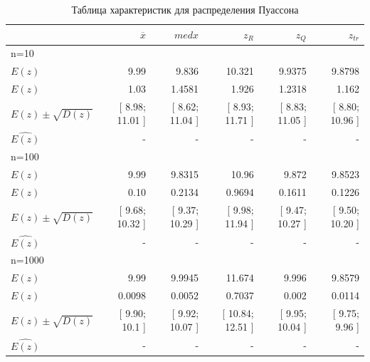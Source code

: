 \documentclass[a4paper,14pt]{article}
\begin{document}
	\begin{table}[H]
		\centering
		\begin{tabular}[t]{|l|r|r|r|r|r|}
			\hline
			& $\overline{x}$ & $med x$ & $z_R$ & $z_Q$ & $z_{tr}$\\\hline\hline
			n=10 & & & & &\\\hline
			$E(z)$  & 9.99 & 9.836 & 10.321 & 9.9375 & 9.8798  \\\hline
$E(z)$  & 1.03 & 1.4581 & 1.926 & 1.2318 & 1.162  \\\hline
$E(z)\pm\sqrt{D(z)}$  & [ 8.98; 11.01 ] & [ 8.62; 11.04 ] & [ 8.93; 11.71 ] & [ 8.83; 11.05 ] & [ 8.80; 10.96 ]  \\\hline
			$\hat{E(z)}$ & - & - & - & - & -\\\hline
			
			n=100 & & & & &\\\hline
			$E(z)$  & 9.99 & 9.8315 & 10.96 & 9.872 & 9.8523  \\\hline
$E(z)$  & 0.10 & 0.2134 & 0.9694 & 0.1611 & 0.1226  \\\hline
$E(z)\pm\sqrt{D(z)}$  & [ 9.68; 10.32 ] & [ 9.37; 10.29 ] & [ 9.98; 11.94 ] & [ 9.47; 10.27 ] & [ 9.50; 10.20 ]  \\\hline
			$\hat{E(z)}$ & - & - & - & - & -\\\hline
			
			n=1000 & & & & &\\\hline
			$E(z)$  & 9.99 & 9.9945 & 11.674 & 9.996 & 9.8579  \\\hline
$E(z)$  & 0.0098 & 0.0052 & 0.7037 & 0.002 & 0.0114  \\\hline
$E(z)\pm\sqrt{D(z)}$  & [ 9.90; 10.1 ] & [ 9.92; 10.07 ] & [ 10.84; 12.51 ] & [ 9.95; 10.04 ] & [ 9.75; 9.96 ]  \\\hline
			$\hat{E(z)}$ & - & - & - & - & -\\\hline
			
		\end{tabular}
		\caption{Таблица характеристик для распределения Пуассона}
		\label{tab:poisson}
	\end{table}
	
\end{document}
